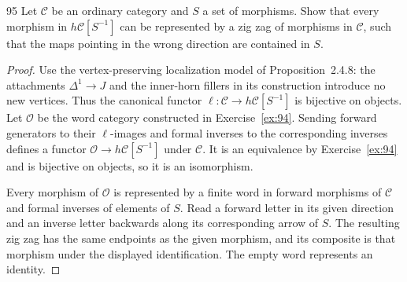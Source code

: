 \begin{exercise}{95}
Let $\mathcal C$ be an ordinary category and $S$ a set of morphisms. Show that
every morphism in $h\mathcal C[S^{-1}]$ can be represented by a zig zag of
morphisms in $\mathcal C$, such that the maps pointing in the wrong direction
are contained in $S$.

\begin{proof}
Use the vertex-preserving localization model of Proposition~2.4.8:
the attachments $\Delta^1\to J$ and the inner-horn fillers in its
construction introduce no new vertices.
Thus the canonical functor $\ell\colon\mathcal C\to h\mathcal C[S^{-1}]$
is bijective on objects.
Let $\mathcal O$ be the word category constructed in
Exercise~\ref{ex:94}.
Sending forward generators to their $\ell$-images and formal inverses to
the corresponding inverses defines a functor
$\mathcal O\to h\mathcal C[S^{-1}]$ under $\mathcal C$.
It is an equivalence by Exercise~\ref{ex:94} and is bijective on objects,
so it is an isomorphism.

Every morphism of $\mathcal O$ is represented by a finite word in forward
morphisms of $\mathcal C$ and formal inverses of elements of $S$.
Read a forward letter in its given direction and an inverse letter
backwards along its corresponding arrow of $S$.
The resulting zig zag has the same endpoints as the given morphism,
and its composite is that morphism under the displayed identification.
The empty word represents an identity.
\end{proof}
\end{exercise}
